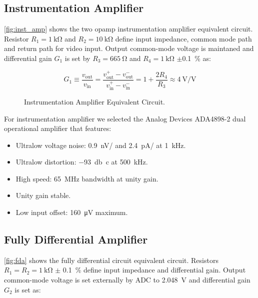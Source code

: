 \subsection{Instrumentation Amplifier}

\autoref{fig:inst_amp} shows the two opamp instrumentation amplifier equivalent circuit. Resistor $R_1=\SI{1}{\kilo\ohm}$ and $R_2=\SI{10}{\kilo\ohm}$ define input impedance, common mode path and return path for video input. Output common-mode voltage is maintaned and differential gain $G_1$ is set by $R_3 = \SI{665}{\ohm}$ and $R_4 = \SI{1}{\kilo\ohm}$ $\pm$\SI{0.1}{\percent} as:

\begin{equation}
    G_1 \equiv \frac{v_\text{out}}{v_\text{in}} =\frac{{v_\text{out}^+-v_\text{out}^-}}{v_\text{in}^+-v_\text{in}^-}= 1+\frac{2R_4}{R_3} \approx \SI{4}{\volt/\volt}
\end{equation}

\begin{figure}[ht]
  \centering
  
  \caption{Instrumentation Amplifier Equivalent Circuit.}
  \label{fig:inst_amp}
\end{figure}

For instrumentation amplifier we selected the Analog Devices ADA4898-2 dual operational amplifier that features:
\begin{itemize}
    \item Ultralow voltage noise: \SI{0.9}{\nano\volt/\sqrtunit{\hertz}} and \SI{2.4}{\pico\ampere/\sqrtunit{\hertz}} at \SI{1}{\kilo\hertz}.
    \item Ultralow distortion: \SI{-93}{\decibel c} at \SI{500}{\kilo\hertz}.
    \item High speed: \SI{65}{\mega\hertz} bandwidth at unity gain.
    \item Unity gain stable.
    \item Low input offset: \SI{160}{\micro\volt} maximum.
\end{itemize}

\subsection{Fully Differential Amplifier}

\autoref{fig:fda} shows the fully differential circuit equivalent circuit. Resistors $R_1=R_2=\SI{1}{\kilo\ohm}$ $\pm$ \SI{0.1}{\percent} define input impedance and differential gain. Output common-mode voltage is set externally by ADC to \SI{2.048}{\volt} and differential gain $G_2$ is set as:

